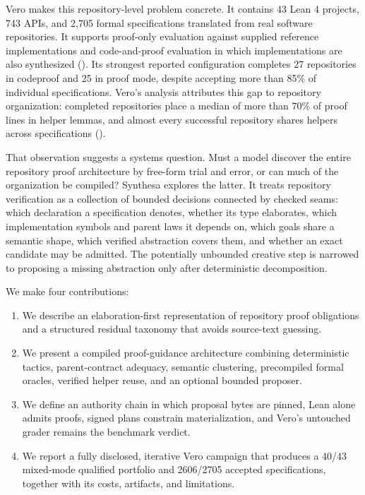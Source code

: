 \documentclass[
  10pt,
]{article}
\providecommand{\tightlist}{%
  \setlength{\itemsep}{0pt}\setlength{\parskip}{0pt}}
\begin{document}
Vero makes this repository-level problem concrete. It contains 43 Lean 4
projects, 743 APIs, and 2,705 formal specifications translated from real
software repositories. It supports proof-only evaluation against
supplied reference implementations and code-and-proof evaluation in
which implementations are also synthesized (). Its strongest reported configuration completes 27
repositories in codeproof and 25 in proof mode, despite accepting more
than 85\% of individual specifications. Vero's analysis attributes this
gap to repository organization: completed repositories place a median of
more than 70\% of proof lines in helper lemmas, and almost every
successful repository shares helpers across specifications
().

That observation suggests a systems question. Must a model discover the
entire repository proof architecture by free-form trial and error, or
can much of the organization be compiled? Synthesa explores the latter.
It treats repository verification as a collection of bounded decisions
connected by checked seams: which declaration a specification denotes,
whether its type elaborates, which implementation symbols and parent
laws it depends on, which goals share a semantic shape, which verified
abstraction covers them, and whether an exact candidate may be admitted.
The potentially unbounded creative step is narrowed to proposing a
missing abstraction only after deterministic decomposition.

We make four contributions:

\begin{enumerate}
\def\labelenumi{\arabic{enumi}.}
\tightlist
\item
  We describe an elaboration-first representation of repository proof
  obligations and a structured residual taxonomy that avoids source-text
  guessing.
\item
  We present a compiled proof-guidance architecture combining
  deterministic tactics, parent-contract adequacy, semantic clustering,
  precompiled formal oracles, verified helper reuse, and an optional
  bounded proposer.
\item
  We define an authority chain in which proposal bytes are pinned, Lean
  alone admits proofs, signed plans constrain materialization, and
  Vero's untouched grader remains the benchmark verdict.
\item
  We report a fully disclosed, iterative Vero campaign that produces a
  40/43 mixed-mode qualified portfolio and 2606/2705 accepted
  specifications, together with its costs, artifacts, and limitations.
\end{enumerate}
\end{document}
